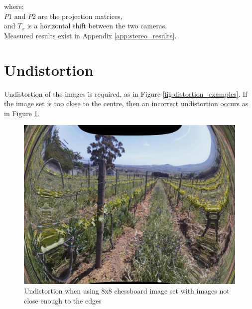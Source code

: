 where:\\
$P1$ and $P2$ are the projection matrices,\\
and $T_x$ is a horizontal shift between the two cameras.\\


Measured results exist in Appendix \ref{app:stereo_results}.

\section{Undistortion}
\label{sec:undistortion}

Undistortion of the images is required, as in Figure \ref{fig:distortion_examples}. If the image set is too close to the centre, then an incorrect undistortion occurs as in Figure \ref{fig:incorrectly_undistorted}.

\begin{figure}[H]
\centering
\includegraphics[scale=0.25]{images/incorrectly_undistorted.jpg}
\caption{Undistortion when using 8x8 chessboard image set with images not close enough to the edges}
\label{fig:incorrectly_undistorted}
\end{figure}

